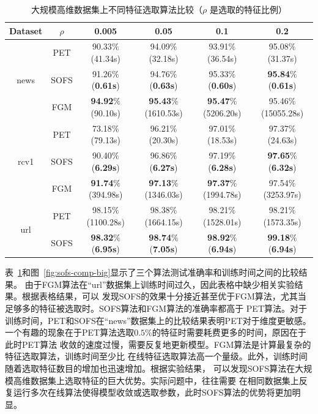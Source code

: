 \documentclass[doctor]{ustcthesis}
\begin{document}
\begin{table}[t]
    \centering
    \caption{大规模高维数据集上不同特征选取算法比较（$\rho$ 是选取的特征比例）}
    \label{tbl:sofs-comp-big}
    \footnotesize
    \begin{tabular}{|c|c|c|c|c|c|}
        \hline
        Dataset & $\rho$ & 0.005 & 0.05 & 0.1 & 0.2\\\hline
        \multirow{3}{*}{news}& PET & 90.33$\%$(41.34s) & 94.09$\%$(32.18s) &
        93.91$\%$(36.54s) & 95.08$\%$(31.37s) \\
        &SOFS &  91.26$\%$(\textbf{0.61s}) & 94.76$\%$(\textbf{0.63s})  &
        95.33$\%$(\textbf{0.60s})  & \textbf{95.84}$\%$(\textbf{0.61s})\\
        &FGM  & \textbf{94.92}$\%$(90.10s)&
        \textbf{95.43}$\%$(1610.53s) & \textbf{95.47}$\%$(5206.20s) &
        95.46$\%$(15055.28s)\\\hline
        \multirow{3}{*}{rcv1} & PET & 73.18$\%$(79.13s)& 96.21$\%$(20.30s)&
        97.01$\%$(18.53s) & 97.37$\%$(24.63s)\\
        &SOFS & 90.40$\%$(\textbf{6.29s}) & 96.86$\%$(\textbf{6.27s}) &
        97.19$\%$(\textbf{6.28s}) & \textbf{97.65}$\%$(\textbf{6.32s})\\
        &FGM & \textbf{91.74}$\%$(394.98s)&
        \textbf{97.13}$\%$(1346.03s) & \textbf{97.37}$\%$(1994.78s)&
        97.54$\%$(3253.97s)\\\hline
        \multirow{2}{*}{url} & PET &  98.15$\%$(1100.28s)& 98.38$\%$(1664.15s) &
        98.21$\%$(1528.01s) &	98.21$\%$(1573.35s)\\
        &SOFS & \textbf{98.32}$\%$(\textbf{6.95s})  & \textbf{98.74}$\%$(\textbf{7.05s}) &
        \textbf{98.92}$\%$(\textbf{6.94s}) & \textbf{99.18}$\%$(\textbf{6.94s}) \\
        \hline
    \end{tabular}
\end{table}


表~\ref{tbl:sofs-comp-big}和图~\ref{fig:sofs-comp-big}显示了三个算法测试准确率和训练时间之间的比较结果。
由于FGM算法在``url''数据集上训练时间过久，因此表格中缺少相关实验结果。根据表格结果，可以
发现SOFS的效果十分接近甚至优于FGM算法，尤其当足够多的特征被选取时。SOFS算法和FGM算法的准确率都高于
PET算法。对于训练时间，PET和SOFS在``news''数据集上的比较结果表明PET对于维度更敏感。
一个有趣的现象在于PET算法选取$0.5\%$的特征时需要耗费更多的时间，原因在于此时PET算法
收敛的速度过慢，需要反复地更新模型。FGM算法是计算最复杂的特征选取算法，训练时间至少比
在线特征选取算法高一个量级。此外，训练时间随着选取特征数目的增加也迅速增加。根据实验结果，
可以发现SOFS算法在大规模高维数据集上选取特征的巨大优势。实际问题中，往往需要
在相同数据集上反复运行多次在线算法使得模型收敛或选取参数，此时SOFS算法的优势将更加明显。
\end{document}
